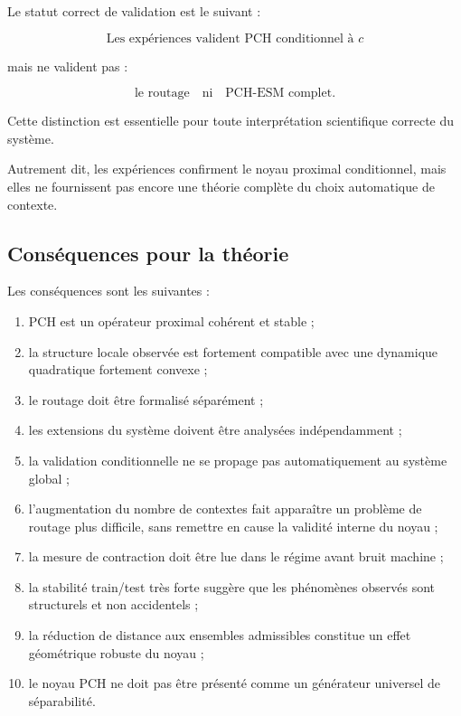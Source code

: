 \documentclass[11pt,a4paper]{article}
\newcommand{\1}{\mathbf 1}
\begin{document}
Le statut correct de validation est le suivant :

\[
\boxed{\text{Les expériences valident PCH conditionnel à } c}
\]

mais ne valident pas :

\[
\boxed{\text{le routage}}
\quad \text{ni} \quad
\boxed{\text{PCH-ESM complet}}.
\]

Cette distinction est essentielle pour toute interprétation scientifique correcte du système.

Autrement dit, les expériences confirment le noyau proximal conditionnel, mais elles ne fournissent pas encore une théorie complète du choix automatique de contexte.

\subsection{Conséquences pour la théorie}

Les conséquences sont les suivantes :

\begin{enumerate}[leftmargin=2em]
\item PCH est un opérateur proximal cohérent et stable ;
\item la structure locale observée est fortement compatible avec une dynamique quadratique fortement convexe ;
\item le routage doit être formalisé séparément ;
\item les extensions du système doivent être analysées indépendamment ;
\item la validation conditionnelle ne se propage pas automatiquement au système global ;
\item l’augmentation du nombre de contextes fait apparaître un problème de routage plus difficile, sans remettre en cause la validité interne du noyau ;
\item la mesure de contraction doit être lue dans le régime avant bruit machine ;
\item la stabilité train/test très forte suggère que les phénomènes observés sont structurels et non accidentels ;
\item la réduction de distance aux ensembles admissibles constitue un effet géométrique robuste du noyau ;
\item le noyau PCH ne doit pas être présenté comme un générateur universel de séparabilité.
\end{enumerate}
\end{document}
